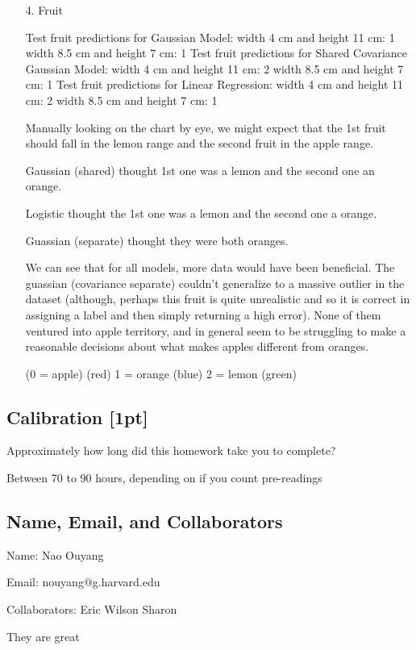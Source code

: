 \documentclass[submit]{harvardml}
\newenvironment{answer}{%
    \color{answergreen}\bf}
  {%
  }
\begin{document}
\begin{enumerate}
    \item[4.]  Fruit
    \begin{answer}

        Test fruit predictions for Gaussian Model:
        width 4 cm and height 11 cm: 1
        width 8.5 cm and height 7 cm: 1
        Test fruit predictions for Shared Covariance Gaussian Model:
        width 4 cm and height 11 cm: 2
        width 8.5 cm and height 7 cm: 1
        Test fruit predictions for Linear Regression:
        width 4 cm and height 11 cm: 2
        width 8.5 cm and height 7 cm: 1


        Manually looking on the chart by eye, we might expect that the 
        1st fruit should fall in the lemon range and the 
        second fruit in the apple range.

        Gaussian (shared) thought 1st one was a lemon and the second one an
        orange. 

        Logistic thought the 1st one was a lemon and the second one a orange.

        Guassian (separate) thought they were both oranges.

        We can see that for all models, more data would have been beneficial.
        The guassian (covariance separate) couldn't generalize to a massive
        outlier in the dataset (although, perhaps this fruit is quite
        unrealistic and so it is correct in assigning a label and then simply
        returning a high error). None of them ventured into apple territory, and
        in general seem to be struggling to make a reasonable decisions about
        what makes apples different from oranges.


        (0 = apple) (red)
        1 = orange (blue)
        2 = lemon (green)

    \end{answer}
\end{enumerate}


\newpage
\subsection*{Calibration [1pt]}
Approximately how long did this homework take you to complete?

Between 70 to 90 hours, depending on if you count pre-readings

\subsection*{Name, Email, and Collaborators}

Name: Nao Ouyang

Email: nouyang@g.harvard.edu    

Collaborators:
Eric
Wilson
Sharon

They are great
\end{document}
